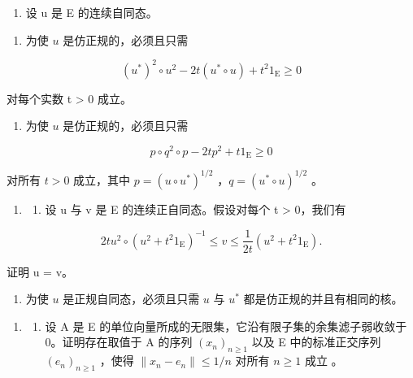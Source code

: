 \begin{enumerate}
\def\labelenumi{\arabic{enumi})}
\setcounter{enumi}{10}
\tightlist
\item
  设 u 是 E 的连续自同态。
\end{enumerate}

\begin{enumerate}
\def\labelenumi{\alph{enumi})}
\tightlist
\item
  为使 \(u\) 是仿正规的，必须且只需
\end{enumerate}

\[
(u ^ {*}) ^ {2} \circ u ^ {2} - 2 t (u ^ {*} \circ u) + t ^ {2} 1 _ {\mathrm{E}} \geqslant 0
\]

对每个实数 t \textgreater{} 0 成立。

\begin{enumerate}
\def\labelenumi{\alph{enumi})}
\setcounter{enumi}{1}
\tightlist
\item
  为使 \(u\) 是仿正规的，必须且只需
\end{enumerate}

\[
p \circ q ^ {2} \circ p - 2 t p ^ {2} + t 1 _ {\mathrm{E}} \geqslant 0
\]

对所有 \(t > 0\) 成立，其中 \(p = (u \circ u^{*})^{1/2}\) ，\(q = (u^{*} \circ u)^{1/2}\) 。

\begin{enumerate}
\def\labelenumi{\arabic{enumi})}
\setcounter{enumi}{11}
\tightlist
\item
  \begin{enumerate}
  \def\labelenumii{\alph{enumii})}
  \tightlist
  \item
    设 u 与 v 是 E 的连续正自同态。假设对每个 t \textgreater{} 0，我们有
  \end{enumerate}
\end{enumerate}

\[
2 t u ^ {2} \circ (u ^ {2} + t ^ {2} 1 _ {\mathrm{E}}) ^ {- 1} \leqslant v \leqslant \frac {1}{2 t} (u ^ {2} + t ^ {2} 1 _ {\mathrm{E}}).
\]

证明 u = v。

\begin{enumerate}
\def\labelenumi{\alph{enumi})}
\setcounter{enumi}{1}
\tightlist
\item
  为使 \(u\) 是正规自同态，必须且只需 \(u\) 与 \(u^*\) 都是仿正规的并且有相同的核。
\end{enumerate}

\begin{enumerate}
\def\labelenumi{\arabic{enumi})}
\setcounter{enumi}{12}
\tightlist
\item
  \begin{enumerate}
  \def\labelenumii{\alph{enumii})}
  \tightlist
  \item
    设 A 是 E 的单位向量所成的无限集，它沿有限子集的余集滤子弱收敛于 0。证明存在取值于 A 的序列 \((x_{n})_{n\geqslant 1}\) 以及 E 中的标准正交序列 \((e_n)_{n\geqslant 1}\) ，使得 \(\| x_n - e_n\| \leqslant 1 / n\) 对所有 \(n\geqslant 1\) 成立 。
  \end{enumerate}
\end{enumerate}

